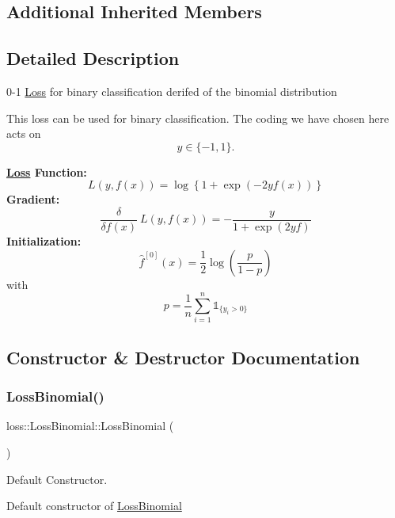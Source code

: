 \subsection*{Additional Inherited Members}


\subsection{Detailed Description}
0-\/1 \hyperlink{classloss_1_1_loss}{Loss} for binary classification derifed of the binomial distribution 

This loss can be used for binary classification. The coding we have chosen here acts on \[ y \in \{-1, 1\}. \]

{\bfseries \hyperlink{classloss_1_1_loss}{Loss} Function\+:} \[ L(y, f(x)) = \log\left\{1 + \exp\left(-2yf(x)\right)\right\} \] {\bfseries Gradient\+:} \[ \frac{\delta}{\delta f(x)}\ L(y, f(x)) = - \frac{y}{1 + \exp\left(2yf\right)} \] {\bfseries Initialization\+:} \[ \hat{f}^{[0]}(x) = \frac{1}{2}\log\left(\frac{p}{1 - p}\right) \] with \[ p = \frac{1}{n}\sum\limits_{i=1}^n\mathbb{1}_{\{y_i > 0\}} \] 

\subsection{Constructor \& Destructor Documentation}
\mbox{\label{classloss_1_1_loss_binomial_ab1d025ad170fc10db1469cccaf8d877d}} 
\subsubsection{\texorpdfstring{Loss\+Binomial()}{LossBinomial()}\hspace{0.1cm}{\footnotesize\ttfamily [1/2]}}
{\footnotesize\ttfamily loss\+::\+Loss\+Binomial\+::\+Loss\+Binomial (\begin{DoxyParamCaption}{ }\end{DoxyParamCaption})}



Default Constructor. 

Default constructor of {\ttfamily \hyperlink{classloss_1_1_loss_binomial}{Loss\+Binomial}} \mbox{\label{classloss_1_1_loss_binomial_a16c4400af5c790a56ac0e0fcb7d1c5c5}} 
